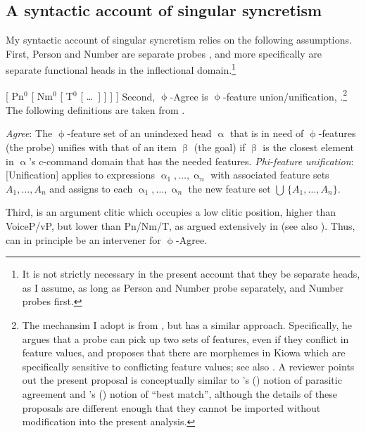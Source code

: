 \documentclass[output=paper]{langscibook}
\def\exattr#1{\hfill{} #1}
\begin{document}
\subsection{A syntactic account of singular \sti syncretism}	


My syntactic account of singular \sti syncretism relies on the following assumptions. First, Person and Number are separate probes \citep{SigurTHsson:2008dm,Bejar:2008sw}, and more specifically are separate functional heads in the inflectional domain.\footnote{It is not strictly necessary in the present account that they be separate heads, as I assume, as long as Person and Number probe separately, and Number probes first.}

\ea
    { [ Pn$^0$ [ Nm$^0$ [ T$^0$ [ \dots\ ] ] ] ] }
\z
Second, $\upphi$-Agree is $\upphi$-feature union/unification, \citep{Kratzer:2009jq,Harbour:2009mh}.\footnote{The mechansim I adopt is from \citet{Kratzer:2009jq}, but \citet{Harbour:2009mh} has a similar approach. Specifically, he argues that a probe can pick up two sets of features, even if they conflict in feature values, and proposes that there are morphemes in Kiowa which are specifically sensitive to conflicting feature values; see also \citet{oxford2019inverse}. A reviewer points out the present proposal is conceptually similar to \citeauthor{kotek2014wh}'s (\citeyear{kotek2014wh})  notion of parasitic agreement and \citeauthor{vanUrk2015}'s (\citeyear{vanUrk2015}) notion of ``best match'', although the details of these proposals are different enough that they cannot be imported without modification into the present analysis.} The following definitions are taken from \citet{Kratzer:2009jq}.

\ea 
    \ea \textit{Agree}: The $\upphi$-feature set of an unindexed head $\upalpha$ that is in need of $\upphi $-features (the probe) unifies with that of an item $\upbeta$ (the goal) if $\upbeta$ is the closest element in $\upalpha$'s c-command domain that has the needed features. 
    \exattr{\mbox{\citep[197]{Kratzer:2009jq}}}%
    \ex \textit{Phi-feature unification}: [Unification] applies to expressions 
    $\upalpha_1, \dots, \upalpha_n$ with associated feature sets $A_1, \dots, A_n$ and 
    assigns to each $\upalpha_1, \dots, \upalpha_n$  the new feature set 
    $\bigcup\,\{A_1, \dots, A_n\}$.
    \exattr{\citep[195]{Kratzer:2009jq}} %
    \z
\z

Third, \sti is an argument clitic which occupies a low clitic position, higher than VoiceP/vP, but lower than Pn/Nm/T, as argued extensively in \citet[ch.2]{Wood2015book} (see also  \citealt{eythors:1995ab,Kissock:1997gm,SigMin,Svenonius:2005vx,Svenonius:2006zt}).  Thus, \sti can in principle be an intervener for $\upphi$-Agree. %
\end{document}

